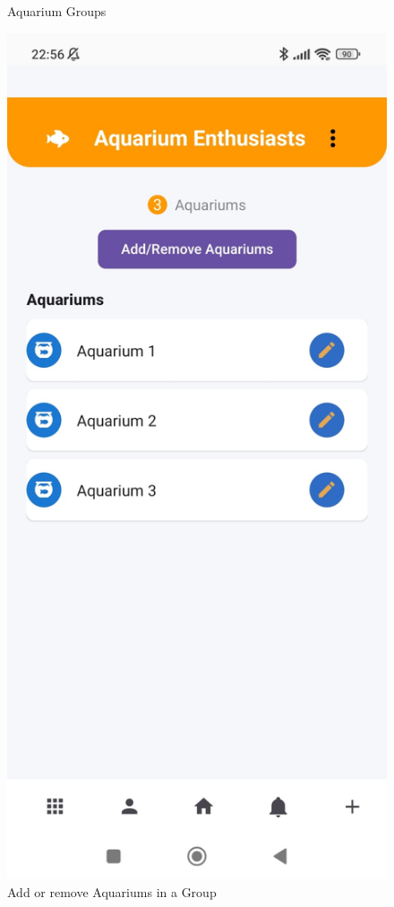 \documentclass[11pt,a4paper]{article}
\begin{document}
\begin{figure}[H]
\begin{minipage}{0.35\textwidth}
        \caption*{Aquarium Groups}
    \end{minipage}
    \hfill
    \begin{minipage}{0.35\textwidth}
        \centering
        \includegraphics[width=\linewidth]{Images/Aquariums in groups.jpeg}
        \caption*{Add or remove Aquariums in a Group}
    \end{minipage}
\end{figure}
\end{document}
